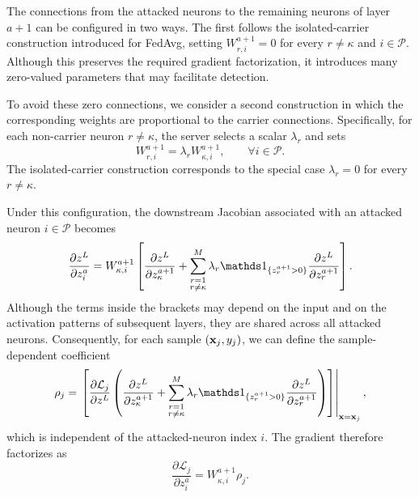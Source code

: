 The connections from the attacked neurons to the remaining neurons of layer $a+1$ can be configured in two ways. The first follows the isolated-carrier construction introduced for FedAvg, setting $W^{a+1}_{r,i}=0$ for every $r\neq\kappa$ and $i\in\mathcal P$. Although this preserves the required gradient factorization, it introduces many zero-valued parameters that may facilitate detection.

To avoid these zero connections, we consider a second construction in which the corresponding weights are proportional to the carrier connections. Specifically, for each non-carrier neuron $r\neq\kappa$, the server selects a scalar $\lambda_r$ and sets
\begin{equation}
W^{a+1}_{r,i}
=
\lambda_r W^{a+1}_{\kappa,i},
\qquad \forall i\in\mathcal P.
\label{eq:stealth_proportional}
\end{equation}
The isolated-carrier construction corresponds to the special case $\lambda_r=0$ for every $r\neq\kappa$.

Under this configuration, the downstream Jacobian associated with an attacked neuron $i\in\mathcal P$ becomes
\begin{equation}
\frac{\partial z^L}{\partial z_i^a}
=
W^{a+1}_{\kappa,i}
\left[
\frac{\partial z^L}{\partial z_\kappa^{a+1}}
+
\sum_{\substack{r=1\\r\neq\kappa}}^M
\lambda_r
\indicator_{\{z_r^{a+1}>0\}}
\frac{\partial z^L}{\partial z_r^{a+1}}
\right].
\label{eq:stealth_jacobian}
\end{equation}
Although the terms inside the brackets may depend on the input and on the activation patterns of subsequent layers, they are shared across all attacked neurons. Consequently, for each sample $({\mathbf{x}}_j,y_j)$, we can define the sample-dependent coefficient
\begin{equation}
\rho_j
=
\left.
\left[
\frac{\partial\mathcal L_j}{\partial z^L}
\left(
\frac{\partial z^L}{\partial z_\kappa^{a+1}}
+
\sum_{\substack{r=1\\r\neq\kappa}}^M
\lambda_r
\indicator_{\{z_r^{a+1}>0\}}
\frac{\partial z^L}{\partial z_r^{a+1}}
\right)
\right]\right|_{\x=\x_j},
\end{equation}
which is independent of the attacked-neuron index $i$. The gradient therefore factorizes as
\begin{equation}
\frac{\partial\mathcal L_j}{\partial z_i^a}
=
W^{a+1}_{\kappa,i}\rho_j.
\label{eq:stealth_factorization}
\end{equation}

